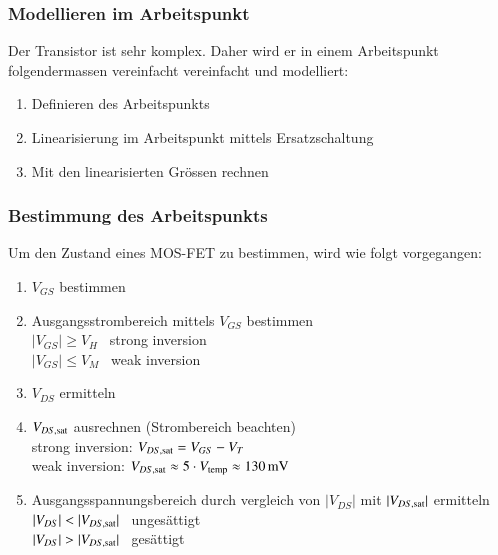 \subsubsection{Modellieren im Arbeitspunkt}
Der Transistor ist sehr komplex.
Daher wird er in einem Arbeitspunkt folgendermassen vereinfacht vereinfacht und modelliert:

\begin{enumerate}
    \item Definieren des Arbeitspunkts
    \item Linearisierung im Arbeitspunkt mittels Ersatzschaltung
    \item Mit den linearisierten Grössen rechnen
\end{enumerate}


\subsubsection{Bestimmung des Arbeitspunkts}
Um den Zustand eines MOS-FET zu bestimmen, wird wie folgt vorgegangen:

\begin{minipage}[t]{0.44\columnwidth}
    \raggedright
    \begin{enumerate}
        \item $V_{GS}$ bestimmen 
        \item Ausgangsstrombereich mittels $V_{GS}$ bestimmen \\
            $|V_{GS}| \geq V_H$ \rightarrow\ strong inversion \\
            $|V_{GS}| \leq V_M$ \rightarrow\ weak inversion
        \item $V_{DS}$ ermitteln
    \end{enumerate}
\end{minipage}
\hfill
\begin{minipage}[t]{0.54\columnwidth}
    \raggedright
    \begin{enumerate}
        \setcounter{enumi}{3}
        \item $V_{DS, \rm sat}$ ausrechnen (Strombereich beachten)  \\
            strong inversion: $V_{DS, \rm sat} = V_{GS} - V_T$  \\
            weak inversion: $V_{DS, \rm sat} \approx 5 \cdot V_{\rm temp} \approx \qty{130}{\milli \volt}$ 
        \item Ausgangsspannungsbereich durch vergleich von $|V_{DS}|$ mit $|V_{DS, \rm sat}|$ ermitteln  \\
            $|V_{DS}| < |V_{DS, \rm sat}|$ \rightarrow\ ungesättigt \\
            $|V_{DS}| > |V_{DS, \rm sat}|$ \rightarrow\ gesättigt
    \end{enumerate}
\end{minipage}


